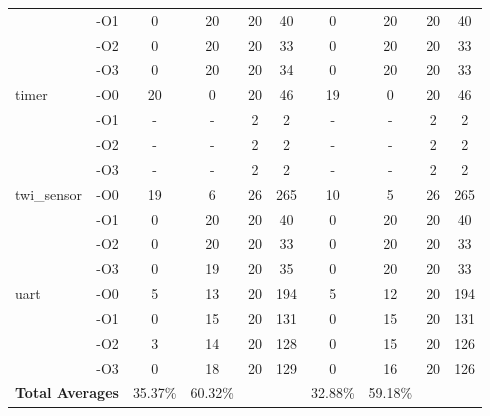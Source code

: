 \begin{tabular}{@{}ll|cccc|cccc@{}}
    & -O1 &  0 & 20 & 20 &  40 &  0 & 20 & 20 &  40  \\
    & -O2 &  0 & 20 & 20 &  33 &  0 & 20 & 20 &  33  \\
    & -O3 &  0 & 20 & 20 &  34 &  0 & 20 & 20 &  33  \\ \midrule
\multirow{4}{*}{timer}
    & -O0 & 20 &  0 & 20 &  46 & 19 &  0 & 20 &  46  \\
    & -O1 &  - &  - &  2 &   2 &  - &  - &  2 &   2  \\
    & -O2 &  - &  - &  2 &   2 &  - &  - &  2 &   2  \\
    & -O3 &  - &  - &  2 &   2 &  - &  - &  2 &   2  \\ \midrule
\multirow{4}{*}{twi\_sensor}
    & -O0 & 19 &  6 & 26 & 265 & 10 &  5 & 26 & 265  \\
    & -O1 &  0 & 20 & 20 &  40 &  0 & 20 & 20 &  40  \\
    & -O2 &  0 & 20 & 20 &  33 &  0 & 20 & 20 &  33  \\
    & -O3 &  0 & 19 & 20 &  35 &  0 & 20 & 20 &  33  \\ \midrule
\multirow{4}{*}{uart}
    & -O0 &  5 & 13 & 20 & 194 &  5 & 12 & 20 & 194  \\
    & -O1 &  0 & 15 & 20 & 131 &  0 & 15 & 20 & 131  \\
    & -O2 &  3 & 14 & 20 & 128 &  0 & 15 & 20 & 126  \\
    & -O3 &  0 & 18 & 20 & 129 &  0 & 16 & 20 & 126  \\ \midrule
\multicolumn{2}{l}{\textbf{Total Averages}}
          & 35.37\% & 60.32\% &&& 32.88\% & 59.18\% &&  \\ \bottomrule
\end{tabular}
